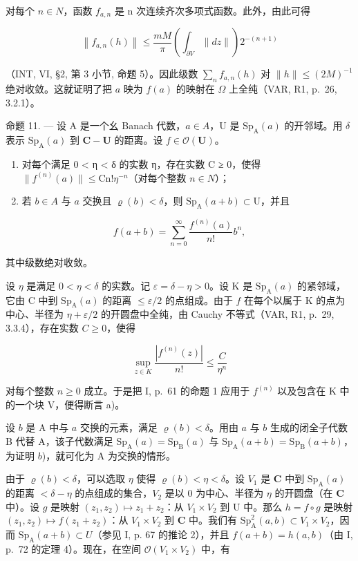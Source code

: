 对每个 \(n \in N\)，函数 \(f_{a,n}\) 是 n 次连续齐次多项式函数。此外，由此可得

\[
\left\| f _ {a, n} (h) \right\| \leqslant \frac {m M}{\pi} \left(\int_ {\partial V} \| d z \|\right) 2 ^ {- (n + 1)}
\]

（INT, VI, §2, 第 3 小节, 命题 5）。因此级数 \(\sum_{n} f_{a,n}(h)\) 对 \(\|h\| \leqslant (2M)^{-1}\) 绝对收敛。这就证明了把 \(a\) 映为 \(f(a)\) 的映射在 \(\Omega\) 上全纯（VAR, R1, p.~26, 3.2.1）。

命题 11. --- 设 A 是一个幺 Banach 代数，\(a \in A\)，U 是 \(\mathrm{Sp}_{\mathrm{A}}(a)\) 的开邻域。用 \(\delta\) 表示 \(\mathrm{Sp}_{\mathrm{A}}(a)\) 到 \(\mathbf{C} - \mathbf{U}\) 的距离。设 \(f \in \mathcal{O}(\mathbf{U})\)。

\begin{enumerate}
\def\labelenumi{\alph{enumi})}
\item
  对每个满足 0 \textless{} η \textless{} δ 的实数 η，存在实数 C ≥ 0，使得 \(\|f^{(n)}(a)\| \leqslant \mathrm{Cn}!\eta^{-n}\)（对每个整数 \(n \in N\)）；
\item
  若 \(b \in A\) 与 \(a\) 交换且 \(\varrho(b) < \delta\)，则 \(\mathrm{Sp}_{\mathrm{A}}(a + b) \subset \mathrm{U}\)，并且
\end{enumerate}

\[
f (a + b) = \sum_ {n = 0} ^ {\infty} \frac {f ^ {(n)} (a)}{n !} b ^ {n},
\]

其中级数绝对收敛。

设 \(\eta\) 是满足 \(0 < \eta < \delta\) 的实数。记 \(\varepsilon = \delta - \eta > 0\)。设 K 是 \(\mathrm{Sp}_{\mathrm{A}}(a)\) 的紧邻域，它由 C 中到 \(\mathrm{Sp}_{\mathrm{A}}(a)\) 的距离 \(\leqslant \varepsilon / 2\) 的点组成。由于 \(f\) 在每个以属于 K 的点为中心、半径为 \(\eta + \varepsilon / 2\) 的开圆盘中全纯，由 Cauchy 不等式（VAR, R1, p.~29, 3.3.4），存在实数 \(C \geqslant 0\)，使得

\[
\sup _ {z \in K} \frac {| f ^ {(n)} (z) |}{n !} \leqslant \frac {C}{\eta^ {n}}
\]

对每个整数 \(n \geqslant 0\) 成立。于是把 I, p.~61 的命题 1 应用于 \(f^{(n)}\) 以及包含在 K 中的一个块 V，便得断言 a)。

设 \(b\) 是 A 中与 \(a\) 交换的元素，满足 \(\varrho(b) < \delta\)。用由 \(a\) 与 \(b\) 生成的闭全子代数 B 代替 A，该子代数满足 \(\mathrm{Sp}_{\mathrm{A}}(a) = \mathrm{Sp}_{\mathrm{B}}(a)\) 与 \(\mathrm{Sp}_{\mathrm{A}}(a + b) = \mathrm{Sp}_{\mathrm{B}}(a + b)\)，为证明 \(b\))，就可化为 A 为交换的情形。

由于 \(\varrho(b) < \delta\)，可以选取 \(\eta\) 使得 \(\varrho(b) < \eta < \delta\)。设 \(V_1\) 是 \(\mathbf{C}\) 中到 \(\mathrm{Sp}_{\mathrm{A}}(a)\) 的距离 \(< \delta - \eta\) 的点组成的集合，\(V_2\) 是以 0 为中心、半径为 \(\eta\) 的开圆盘（在 \(\mathbf{C}\) 中）。设 \(g\) 是映射 \((z_1, z_2) \mapsto z_1 + z_2\)：从 \(V_1 \times V_2\) 到 U 中。那么 \(h = f \circ g\) 是映射 \((z_1, z_2) \mapsto f(z_1 + z_2)\)：从 \(V_1 \times V_2\) 到 \(\mathbf{C}\) 中。我们有 \(\mathrm{Sp}_{\mathrm{A}}^{2}(a, b) \subset V_1 \times V_2\)，因而 \(\mathrm{Sp}_{\mathrm{A}}(a + b) \subset U\)（参见 I, p. 67 的推论 2），并且 \(f(a + b) = h(a, b)\)（由 I, p.~72 的定理 4）。现在，在空间 \(\mathcal{O}(V_1 \times V_2)\) 中，有

